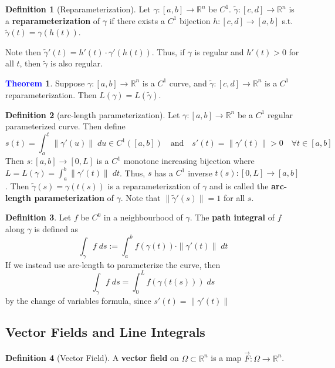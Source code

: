 \documentclass[11pt]{article}
\theoremstyle{definition}
\theoremstyle{definition}
\newcommand{\R}[0]{\mathbb{R}}
\newtheorem{theorem}{\textcolor{blue}{Theorem}}
\theoremstyle{definition}
\newtheorem{definition}{\textcolor{OliveGreen}{Definition}}
\theoremstyle{remark}
\begin{document}
\begin{definition}[Reparameterization]
    Let $\gamma : [a,b] \to \R^n$ be $C^1$. $\tilde{\gamma} : [c,d] \to \R^n$ is a \textbf{reparameterization} of $\gamma$
    if there exists a $C^1$ bijection $h : [c,d] \to [a,b]$ s.t. $\tilde{\gamma}(t) = \gamma(h(t))$.
    
    Note then $\tilde{\gamma}'(t) = h'(t) \cdot \gamma'(h(t))$. Thus, if $\gamma$ is regular and $h'(t) > 0$ for all $t$, then $\tilde{\gamma}$ is also regular.
\end{definition}

\begin{theorem}
    Suppose $\gamma :[a,b] \to \R^n$ is a $C^1$ curve, and $\tilde{\gamma} : [c,d] \to \R^n$ is a $C^1$ reparameterization.
    Then $L(\gamma) = L(\tilde{\gamma})$.    
\end{theorem}

\begin{definition}[arc-length parameterization]
    Let $\gamma : [a,b] \to \R^n$ be a $C^1$ regular parameterized curve. Then define
    \[
        s(t) = \int_a^t \| \gamma'(u) \| \; du \in C^1([a,b]) \quad \text{and} \quad s'(t) = \| \gamma'(t) \| > 0 \quad \forall t \in [a,b] 
    \]   
    Then $s : [a,b] \to [0, L]$ is a $C^1$ monotone increasing bijection where $L = L(\gamma) = \int_a^b \| \gamma'(t) \| \; dt$. Thus, $s$ has a $C^1$ inverse $t(s) : [0, L] \to [a,b]$. Then $\tilde{\gamma}(s) = \gamma(t(s))$ is a reparameterization of $\gamma$ and is called the \textbf{arc-length parameterization} of $\gamma$. Note that $\|\tilde{\gamma}'(s)\| = 1$ for all $s$.  
\end{definition}

\begin{definition}
    Let $f$ be $C^0$ in a neighbourhood of $\gamma$. The \textbf{path integral} of $f$ along $\gamma$ is defined as
    \[
        \int_{\gamma} f \; ds := \int_a^b f(\gamma(t)) \cdot \| \gamma'(t) \| \; dt
    \]     
    If we instead use arc-length to parameterize the curve, then
    \[
        \int_{\gamma} f \; ds = \int_0^L f(\gamma(t(s))) \; ds 
    \] 
    by the change of variables formula, since $s'(t) = \| \gamma'(t) \|$ 
\end{definition}

\subsection{Vector Fields and Line Integrals}

\begin{definition}[Vector Field]
    A \textbf{vector field} on $\Omega \subset \R^n$ is a map $\vec{F} : \Omega \to \R^n$. 
\end{definition}
\end{document}
